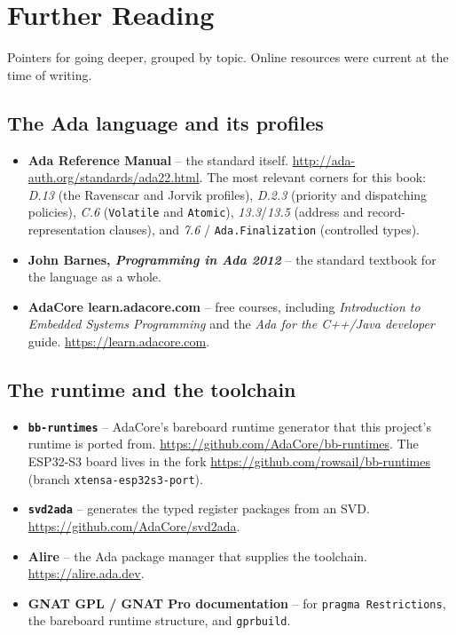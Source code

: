 \chapter{Further Reading}
\label{ch:references}

Pointers for going deeper, grouped by topic. Online resources were current at the
time of writing.

\section{The Ada language and its profiles}

\begin{itemize}
\item \textbf{Ada Reference Manual} -- the standard itself.
  \url{http://ada-auth.org/standards/ada22.html}. The most relevant corners for
  this book: \emph{D.13} (the Ravenscar and Jorvik profiles), \emph{D.2.3}
  (priority and dispatching policies), \emph{C.6} (\texttt{Volatile} and
  \texttt{Atomic}), \emph{13.3}/\emph{13.5} (address and record-representation
  clauses), and \emph{7.6} / \texttt{Ada.Finalization} (controlled types).
\item \textbf{John Barnes, \emph{Programming in Ada 2012}} -- the standard
  textbook for the language as a whole.
\item \textbf{AdaCore learn.adacore.com} -- free courses, including
  \emph{Introduction to Embedded Systems Programming} and the
  \emph{Ada for the C++/Java developer} guide. \url{https://learn.adacore.com}.
\end{itemize}

\section{The runtime and the toolchain}

\begin{itemize}
\item \textbf{\texttt{bb-runtimes}} -- AdaCore's bareboard runtime generator that
  this project's runtime is ported from.
  \url{https://github.com/AdaCore/bb-runtimes}. The ESP32-S3 board lives in the
  fork \url{https://github.com/rowsail/bb-runtimes} (branch
  \texttt{xtensa-esp32s3-port}).
\item \textbf{\texttt{svd2ada}} -- generates the typed register packages from an
  SVD. \url{https://github.com/AdaCore/svd2ada}.
\item \textbf{Alire} -- the Ada package manager that supplies the toolchain.
  \url{https://alire.ada.dev}.
\item \textbf{GNAT GPL / GNAT Pro documentation} -- for \texttt{pragma
  Restrictions}, the bareboard runtime structure, and \texttt{gprbuild}.
\end{itemize}

